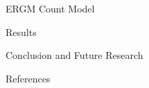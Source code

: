 \documentclass{beamer}
\begin{document}
\begin{frame}{ERGM Count Model}


\end{frame}

\begin{frame}{Results}


\end{frame}


\begin{frame}{Conclusion and Future Research}

\end{frame}


\begin{frame}{References}


\end{frame}
\end{document}
